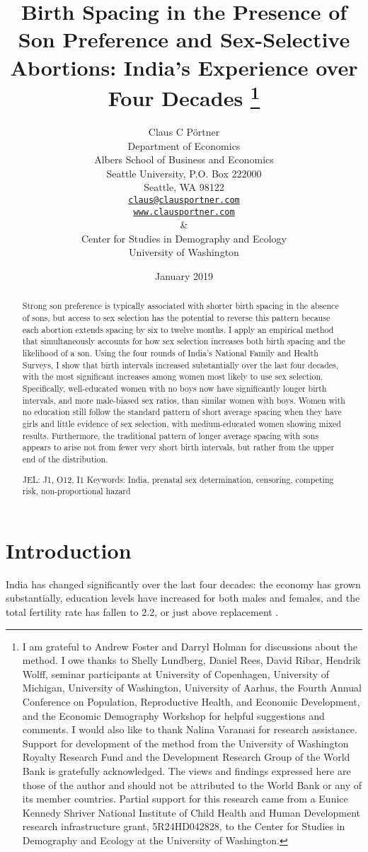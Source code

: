 \documentclass[12pt,letterpaper]{article}
\title{Birth Spacing in the Presence of Son Preference and Sex-Selective Abortions:
India's Experience over Four Decades%
\protect\thanks{%
I am grateful to Andrew Foster and Darryl Holman for discussions about the method.
I owe thanks to Shelly Lundberg, Daniel Rees, David Ribar, 
Hendrik Wolff, seminar participants at University of Copenhagen, University of Michigan, 
University of Washington, University of Aarhus, the Fourth 
Annual Conference on Population, Reproductive Health, 
and Economic Development, and the Economic Demography Workshop for helpful 
suggestions and comments.
I would also like to thank Nalina Varanasi for research assistance.
Support for development of the method from the University of Washington Royalty 
Research Fund and the Development Research Group of the World Bank is gratefully 
acknowledged.
The views and findings expressed here are those of the author and
should not be attributed to the World Bank or any of its member countries.
Partial support for this research came from a Eunice Kennedy Shriver National
Institute of Child Health and Human Development research infrastructure grant,
5R24HD042828, to the Center for Studies in Demography and Ecology at the
University of Washington.
}
}
\author{Claus C P\"ortner\\
    Department of Economics\\
    Albers School of Business and Economics\\
    Seattle University, P.O. Box 222000\\
    Seattle, WA 98122\\
    \href{mailto:claus@clausportner.com}{\texttt{claus@clausportner.com}}\\
    \href{http://www.clausportner.com}{\texttt{www.clausportner.com}}\\
    \& \\
    Center for Studies in Demography and Ecology \\
    University of Washington\\ \vspace{2cm}
    }
\date{January 2019}
\begin{document}
\graphicspath{{../figures/}}

\setcounter{page}{-1}
\maketitle
\thispagestyle{empty}



\newpage
\thispagestyle{empty}
\doublespacing

\begin{abstract}

\noindent 
Strong son preference is typically associated with shorter birth spacing in the absence of 
sons, but access to sex selection has the potential to reverse this pattern because each 
abortion extends spacing by six to twelve months. 
I apply an empirical method that simultaneously accounts for how sex selection 
increases both birth spacing and the likelihood of a son. 
Using the four rounds of India's National Family and Health Surveys, I show that birth 
intervals increased substantially over the last four decades, with the most significant
increases among women most likely to use sex selection.
Specifically, well-educated women with no boys now have significantly longer birth
intervals, and more male-biased sex ratios, than similar women with boys. 
Women with no education still follow the standard pattern of short average spacing when 
they have girls and little evidence of sex selection, with medium-educated women showing 
mixed results.
Furthermore, the traditional pattern of longer average spacing with sons appears to arise 
not from fewer very short birth intervals, but rather from the upper end of the distribution.


\noindent JEL: J1, O12, I1
\noindent Keywords: India, prenatal sex determination, censoring, competing risk, non-proportional hazard
\end{abstract}

\newpage



\section{Introduction\label{sec:intro}}

India has changed significantly over the last four decades:
the economy has grown substantially,
education levels have increased for both males and females,
and the total fertility rate has fallen to 2.2, or just above replacement 
\citep{Bosworth2008,Dharmalingam2014,
International-Institute-for-Population-Sciences-IIPS2017}.
\end{document}
